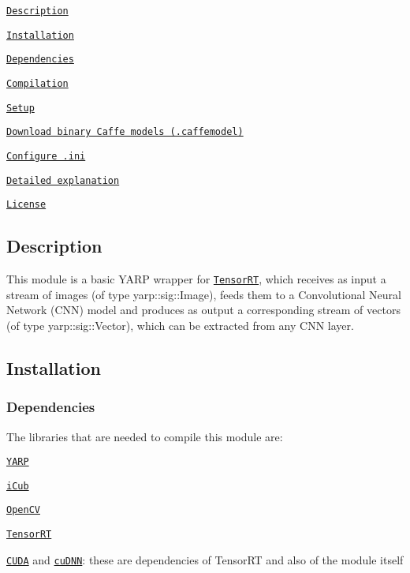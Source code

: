 
\begin{DoxyItemize}
\item \href{#description}{\tt Description}
\item \href{#installation}{\tt Installation}
\begin{DoxyItemize}
\item \href{#dependencies}{\tt Dependencies}
\item \href{#compilation}{\tt Compilation}
\end{DoxyItemize}
\item \href{#setup}{\tt Setup}
\begin{DoxyItemize}
\item \href{#download-binary-caffe-models-caffemodel}{\tt Download binary Caffe models (.caffemodel)}
\item \href{#configure-ini}{\tt Configure .ini}
\end{DoxyItemize}
\item \href{#detailed-explanation}{\tt Detailed explanation}
\item \href{#license}{\tt License}
\end{DoxyItemize}

\subsection*{Description}

This module is a basic Y\+A\+RP wrapper for \href{https://developer.nvidia.com/tensorrt}{\tt Tensor\+RT}, which receives as input a stream of images (of type {\ttfamily yarp\+::sig\+::\+Image}), feeds them to a Convolutional Neural Network (C\+NN) model and produces as output a corresponding stream of vectors (of type {\ttfamily yarp\+::sig\+::\+Vector}), which can be extracted from any C\+NN layer.

\subsection*{Installation}

\subsubsection*{Dependencies}

The libraries that are needed to compile this module are\+:


\begin{DoxyItemize}
\item \href{https://github.com/robotology/yarp}{\tt Y\+A\+RP}
\item \href{https://github.com/robotology/icub-main}{\tt i\+Cub}
\item \href{http://opencv.org/releases.html}{\tt Open\+CV}
\item \href{https://developer.nvidia.com/tensorrt}{\tt Tensor\+RT}
\item \href{https://developer.nvidia.com/cuda-zone}{\tt C\+U\+DA} and \href{https://developer.nvidia.com/cudnn}{\tt cu\+D\+NN}\+: these are dependencies of Tensor\+RT and also of the module itself
\end{DoxyItemize}

